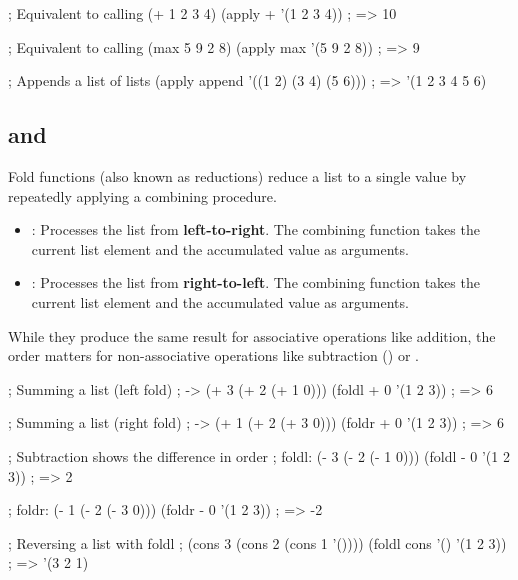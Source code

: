 \begin{racketcode}
; Equivalent to calling (+ 1 2 3 4)
(apply + '(1 2 3 4)) ; => 10

; Equivalent to calling (max 5 9 2 8)
(apply max '(5 9 2 8)) ; => 9

; Appends a list of lists
(apply append '((1 2) (3 4) (5 6))) ; => '(1 2 3 4 5 6)
\end{racketcode}

\subsection{ and }
Fold functions (also known as reductions) reduce a list to a single value by repeatedly applying a combining procedure.

\begin{itemize}
    \item {}: Processes the list from \textbf{left-to-right}. The combining function takes the current list element and the accumulated value as arguments.
    \item {}: Processes the list from \textbf{right-to-left}. The combining function takes the current list element and the accumulated value as arguments.
\end{itemize}

While they produce the same result for associative operations like addition, the order matters for non-associative operations like subtraction (\code{-}) or .

\begin{racketcode}
; Summing a list (left fold)
; -> (+ 3 (+ 2 (+ 1 0)))
(foldl + 0 '(1 2 3)) ; => 6

; Summing a list (right fold)
; -> (+ 1 (+ 2 (+ 3 0)))
(foldr + 0 '(1 2 3)) ; => 6

; Subtraction shows the difference in order
; foldl: (- 3 (- 2 (- 1 0)))
(foldl - 0 '(1 2 3)) ; => 2

; foldr: (- 1 (- 2 (- 3 0)))
(foldr - 0 '(1 2 3)) ; => -2

; Reversing a list with foldl
; (cons 3 (cons 2 (cons 1 '())))
(foldl cons '() '(1 2 3)) ; => '(3 2 1)
\end{racketcode}